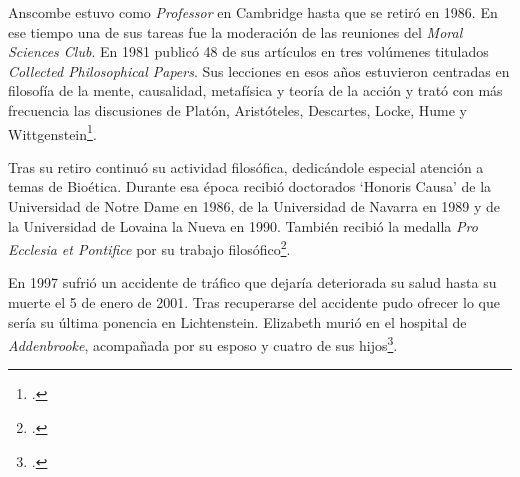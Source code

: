 Anscombe estuvo como \emph{Professor} en Cambridge hasta que se retiró en 1986. En ese tiempo una de sus tareas fue la moderación de las reuniones del \emph{Moral Sciences Club}. En 1981 publicó 48 de sus artículos en tres volúmenes titulados \emph{Collected Philosophical Papers}. Sus lecciones en esos años estuvieron centradas en filosofía de la mente, causalidad, metafísica y teoría de la acción y trató con más frecuencia las discusiones de Platón, Aristóteles, Descartes, Locke, Hume y Wittgenstein\footcite[Cf.][46]{torralba2005accion}.

Tras su retiro continuó su actividad filosófica, dedicándole especial atención a temas de Bioética. Durante esa época recibió doctorados `Honoris Causa' de la Universidad de Notre Dame en 1986, de la Universidad de Navarra en 1989 y de la Universidad de Lovaina la Nueva en 1990. También recibió la medalla \emph{Pro Ecclesia et Pontifice} por su trabajo filosófico\footcite[Cf.][48]{torralba2005accion}.

En 1997 sufrió un accidente de tráfico que dejaría deteriorada su salud hasta su muerte el 5 de enero de 2001. Tras recuperarse del accidente pudo ofrecer lo que sería su última ponencia en Lichtenstein. Elizabeth murió en el hospital de \emph{Addenbrooke}, acompañada por su esposo y cuatro de sus hijos\footcite[Cf.][50]{teichman2002fellows}.
